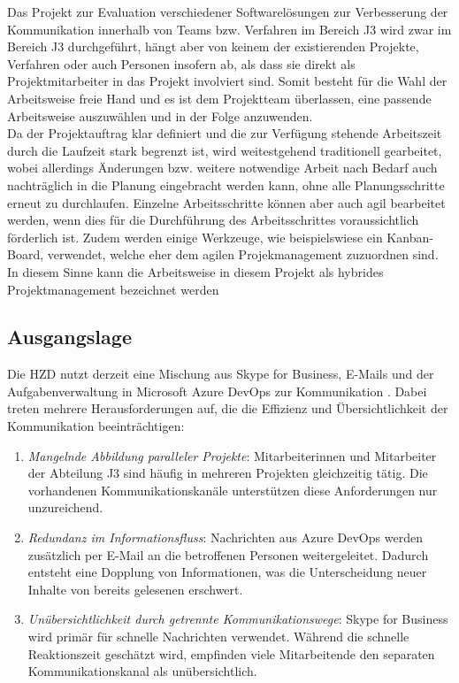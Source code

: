 \documentclass[ThesisDJ.tex]{subfiles}
\begin{document}
	Das Projekt zur Evaluation verschiedener Softwarelösungen zur Verbesserung der Kommunikation innerhalb von Teams bzw. Verfahren im Bereich J3 wird zwar im Bereich J3 durchgeführt, hängt aber von keinem der existierenden Projekte, Verfahren oder auch Personen insofern ab, als dass sie direkt als Projektmitarbeiter in das Projekt involviert sind. Somit besteht für die Wahl der Arbeitsweise freie Hand und es ist dem Projektteam überlassen, eine passende Arbeitsweise auszuwählen und in der Folge anzuwenden.\\
	Da der Projektauftrag klar definiert und die zur Verfügung stehende Arbeitszeit durch die Laufzeit stark begrenzt ist, wird weitestgehend traditionell gearbeitet, wobei allerdings Änderungen bzw. weitere notwendige Arbeit nach Bedarf auch nachträglich in die Planung eingebracht werden kann, ohne alle Planungsschritte erneut zu durchlaufen. Einzelne Arbeitsschritte können aber auch agil bearbeitet werden, wenn dies für die Durchführung des Arbeitsschrittes voraussichtlich förderlich ist. Zudem werden einige Werkzeuge, wie beispielswiese ein Kanban-Board, verwendet, welche eher dem agilen Projekmanagement zuzuordnen sind. In diesem Sinne kann die Arbeitsweise in diesem Projekt
	als hybrides Projektmanagement bezeichnet werden
	
  \subsection{Ausgangslage}
  Die HZD nutzt derzeit eine Mischung aus Skype for Business, E-Mails und der Aufgabenverwaltung in Microsoft Azure DevOps zur Kommunikation \cite{microsoft_azure_nodate}. 
  Dabei treten mehrere Herausforderungen auf, die die Effizienz und Übersichtlichkeit der Kommunikation beeinträchtigen:

  \begin{enumerate}
    \item \emph{Mangelnde Abbildung paralleler Projekte}: Mitarbeiterinnen und Mitarbeiter der Abteilung J3 sind häufig in mehreren Projekten gleichzeitig tätig. Die vorhandenen Kommunikationskanäle unterstützen diese Anforderungen nur unzureichend.
    \item \emph{Redundanz im Informationsfluss}: Nachrichten aus Azure DevOps werden zusätzlich per E-Mail an die betroffenen Personen weitergeleitet. Dadurch entsteht eine Dopplung von Informationen, was die Unterscheidung neuer Inhalte von bereits gelesenen erschwert.
    \item \emph{Unübersichtlichkeit durch getrennte Kommunikationswege}: Skype for Business wird primär für schnelle Nachrichten verwendet. Während die schnelle Reaktionszeit geschätzt wird, empfinden viele Mitarbeitende den separaten Kommunikationskanal als unübersichtlich.
  \end{enumerate}
\end{document}
